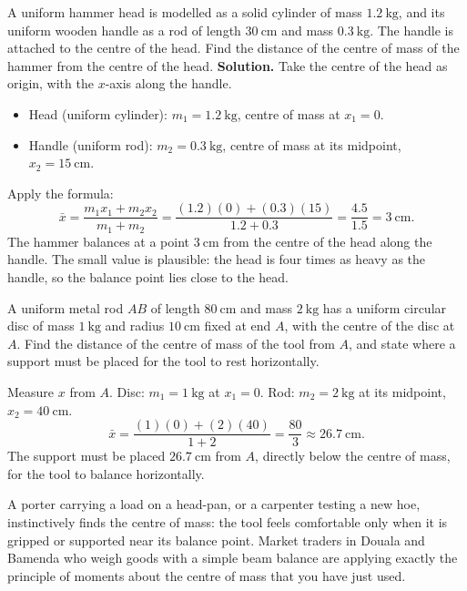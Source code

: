 \documentclass[11pt]{article}
\begin{document}
\begin{exoresolu}
A uniform hammer head is modelled as a solid cylinder of mass $1.2\ \mathrm{kg}$, and its uniform wooden handle as a rod of length $30\ \mathrm{cm}$ and mass $0.3\ \mathrm{kg}$. The handle is attached to the centre of the head. Find the distance of the centre of mass of the hammer from the centre of the head.
\tcblower
\textbf{Solution.} Take the centre of the head as origin, with the $x$-axis along the handle.
\begin{itemize}
\item Head (uniform cylinder): $m_1 = 1.2\ \mathrm{kg}$, centre of mass at $x_1 = 0$.
\item Handle (uniform rod): $m_2 = 0.3\ \mathrm{kg}$, centre of mass at its midpoint, $x_2 = 15\ \mathrm{cm}$.
\end{itemize}
Apply the formula:
\[
\bar{x}=\frac{m_1x_1+m_2x_2}{m_1+m_2}
=\frac{(1.2)(0)+(0.3)(15)}{1.2+0.3}
=\frac{4.5}{1.5}=3\ \mathrm{cm}.
\]
The hammer balances at a point $3\ \mathrm{cm}$ from the centre of the head along the handle. The small value is plausible: the head is four times as heavy as the handle, so the balance point lies close to the head.
\end{exoresolu}

\begin{exercice}
A uniform metal rod $AB$ of length $80\ \mathrm{cm}$ and mass $2\ \mathrm{kg}$ has a uniform circular disc of mass $1\ \mathrm{kg}$ and radius $10\ \mathrm{cm}$ fixed at end $A$, with the centre of the disc at $A$. Find the distance of the centre of mass of the tool from $A$, and state where a support must be placed for the tool to rest horizontally.
\end{exercice}

\begin{corrige}[Exercise 1]
Measure $x$ from $A$. Disc: $m_1=1\ \mathrm{kg}$ at $x_1=0$. Rod: $m_2=2\ \mathrm{kg}$ at its midpoint, $x_2=40\ \mathrm{cm}$.
\[
\bar{x}=\frac{(1)(0)+(2)(40)}{1+2}=\frac{80}{3}\approx 26.7\ \mathrm{cm}.
\]
The support must be placed $26.7\ \mathrm{cm}$ from $A$, directly below the centre of mass, for the tool to balance horizontally.
\end{corrige}

\begin{savaistu}
A porter carrying a load on a head-pan, or a carpenter testing a new hoe, instinctively finds the centre of mass: the tool feels comfortable only when it is gripped or supported near its balance point. Market traders in Douala and Bamenda who weigh goods with a simple beam balance are applying exactly the principle of moments about the centre of mass that you have just used.
\end{savaistu}
\end{document}
